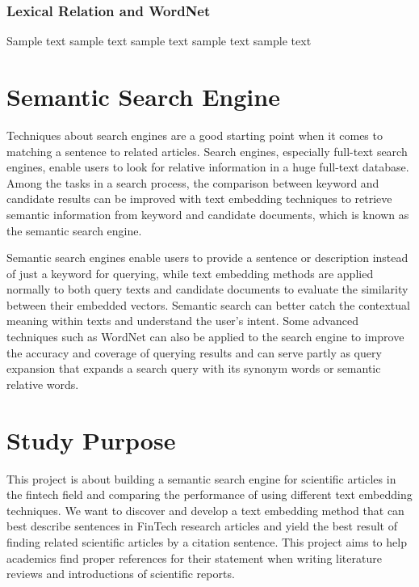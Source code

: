 \subsubsection{Lexical Relation and WordNet}
Sample text sample text sample text sample text sample text

\section{Semantic Search Engine}
Techniques about search engines are a good starting point when it comes to matching a sentence to related articles.
Search engines, especially full-text search engines, enable users to look for relative information in a huge full-text database.
Among the tasks in a search process, the comparison between keyword and candidate results can be improved with text embedding techniques to retrieve semantic information from keyword and candidate documents, which is known as the semantic search engine.

Semantic search engines enable users to provide a sentence or description instead of just a keyword for querying, while text embedding methods are applied normally to both query texts and candidate documents to evaluate the similarity between their embedded vectors.
Semantic search can better catch the contextual meaning within texts and understand the user's intent.
Some advanced techniques such as WordNet can also be applied to the search engine to improve the accuracy and coverage of querying results and can serve partly as query expansion that expands a search query with its synonym words or semantic relative words.


\section{Study Purpose}
This project is about building a semantic search engine for scientific articles in the fintech field and comparing the performance of using different text embedding techniques.
We want to discover and develop a text embedding method that can best describe sentences in FinTech research articles and yield the best result of finding related scientific articles by a citation sentence.
This project aims to help academics find proper references for their statement when writing literature reviews and introductions of scientific reports.

